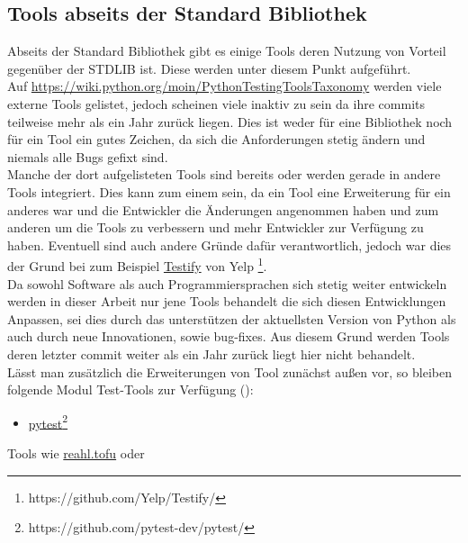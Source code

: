 \subsection{Tools abseits der Standard Bibliothek}\label{python-tools:extlib}
Abseits der Standard Bibliothek gibt es einige Tools deren Nutzung von
Vorteil gegenüber der STDLIB ist. Diese werden unter diesem Punkt aufgeführt.
\newline
\\
Auf \url{https://wiki.python.org/moin/PythonTestingToolsTaxonomy} werden viele
externe Tools gelistet, jedoch scheinen viele inaktiv zu sein da ihre
\glspl{commit} teilweise mehr als ein Jahr zurück liegen. Dies ist weder für
eine Bibliothek noch für ein Tool ein gutes Zeichen, da sich die Anforderungen
stetig ändern und niemals alle Bugs gefixt sind.
\newline
\\
Manche der dort aufgelisteten Tools sind bereits oder werden gerade in andere Tools
integriert. Dies kann zum einem sein, da ein Tool eine Erweiterung für ein anderes
war und die Entwickler die Änderungen angenommen haben und zum anderen um die Tools
zu verbessern und mehr Entwickler zur Verfügung zu haben. Eventuell sind auch
andere Gründe dafür verantwortlich, jedoch war dies der Grund bei zum Beispiel
\href{https://github.com/Yelp/Testify/}{Testify}
von Yelp \footnote{https://github.com/Yelp/Testify/}.
\newline
\\
Da sowohl Software als auch Programmiersprachen sich stetig weiter entwickeln
werden in dieser Arbeit nur jene Tools behandelt die sich diesen Entwicklungen
Anpassen, sei dies durch das unterstützen der aktuellsten Version von Python als
auch durch neue Innovationen, sowie \Gls{bug}-fixes. Aus diesem Grund werden
Tools deren letzter \Gls{commit} weiter als ein Jahr zurück liegt hier nicht
behandelt.
\newline
\\
Lässt man zusätzlich die Erweiterungen von Tool zunächst außen vor, so bleiben
folgende Modul Test-Tools zur Verfügung
(\cite{wiki.python:PythonTestingToolsTaxonomy}):
\begin{itemize}
    \item \href{https://github.com/pytest-dev/pytest/}{pytest}\footnote{https://github.com/pytest-dev/pytest/}
\end{itemize}
Tools wie \href{https://www.reahl.org/docs/4.0/devtools/tofu.d.html}{reahl.tofu} oder
